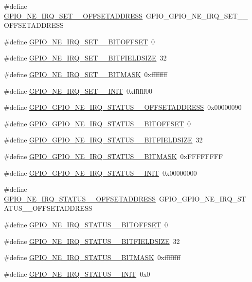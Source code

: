 \begin{DoxyCompactItemize}
\item 
\#define \hyperlink{a00553_aa05177828bd3ef0b759efe33ac9dda07}{GPIO\_\-NE\_\-IRQ\_\-SET\_\_\-OFFSETADDRESS}~GPIO\_\-GPIO\_\-NE\_\-IRQ\_\-SET\_\_\-OFFSETADDRESS
\item 
\#define \hyperlink{a00553_ab2624703140e9bfbf87e57cf08af8bbe}{GPIO\_\-NE\_\-IRQ\_\-SET\_\_\-BITOFFSET}~0
\item 
\#define \hyperlink{a00553_abaf1914f4e7d6844363dabd3b2eec583}{GPIO\_\-NE\_\-IRQ\_\-SET\_\_\-BITFIELDSIZE}~32
\item 
\#define \hyperlink{a00553_a92a73319f5c137226c905d856d9b80b6}{GPIO\_\-NE\_\-IRQ\_\-SET\_\_\-BITMASK}~0xffffffff
\item 
\#define \hyperlink{a00553_a66e2d68e58d565b73d2c7f1a8e1e63fd}{GPIO\_\-NE\_\-IRQ\_\-SET\_\_\-INIT}~0xffffff00
\item 
\#define \hyperlink{a00553_a4532cd01bae5a44c1c88e39a7774c4fd}{GPIO\_\-GPIO\_\-NE\_\-IRQ\_\-STATUS\_\_\-OFFSETADDRESS}~0x00000090
\item 
\#define \hyperlink{a00553_ab8117cb9581eace6ad74a1f1f80ba203}{GPIO\_\-GPIO\_\-NE\_\-IRQ\_\-STATUS\_\_\-BITOFFSET}~0
\item 
\#define \hyperlink{a00553_a4fb328e6e23fdb129381d28c6db67c9d}{GPIO\_\-GPIO\_\-NE\_\-IRQ\_\-STATUS\_\_\-BITFIELDSIZE}~32
\item 
\#define \hyperlink{a00553_a41bd89494a733e395900b2c93b0c7e3c}{GPIO\_\-GPIO\_\-NE\_\-IRQ\_\-STATUS\_\_\-BITMASK}~0xFFFFFFFF
\item 
\#define \hyperlink{a00553_a6444e98ca8742e48f5c8e8f85cf85066}{GPIO\_\-GPIO\_\-NE\_\-IRQ\_\-STATUS\_\_\-INIT}~0x00000000
\item 
\#define \hyperlink{a00553_a39c1c6d0efbbb357927e7ad545d6dc0a}{GPIO\_\-NE\_\-IRQ\_\-STATUS\_\_\-OFFSETADDRESS}~GPIO\_\-GPIO\_\-NE\_\-IRQ\_\-STATUS\_\_\-OFFSETADDRESS
\item 
\#define \hyperlink{a00553_a3c16a77dc16cc958c15824fb5d397b96}{GPIO\_\-NE\_\-IRQ\_\-STATUS\_\_\-BITOFFSET}~0
\item 
\#define \hyperlink{a00553_a6ef061e76271ef86e04294d948ddec19}{GPIO\_\-NE\_\-IRQ\_\-STATUS\_\_\-BITFIELDSIZE}~32
\item 
\#define \hyperlink{a00553_acc88b7f302144af7604ed27bfe1c4ce8}{GPIO\_\-NE\_\-IRQ\_\-STATUS\_\_\-BITMASK}~0xffffffff
\item 
\#define \hyperlink{a00553_a92db188dcc84c9bdd5b3e714ed400534}{GPIO\_\-NE\_\-IRQ\_\-STATUS\_\_\-INIT}~0x0
\item 

\end{DoxyCompactItemize}
